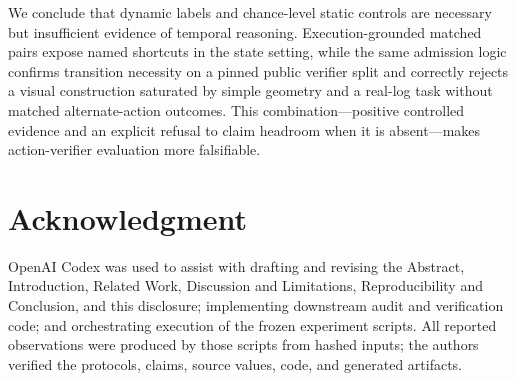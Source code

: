 \documentclass[letterpaper,10pt,conference]{ieeeconf}
\begin{document}
We conclude that dynamic labels and chance-level static controls are necessary
but insufficient evidence of temporal reasoning. Execution-grounded matched
pairs expose named shortcuts in the state setting, while the same admission
logic confirms transition necessity on a pinned public verifier split and
correctly rejects a visual construction saturated by simple geometry and a
real-log task without matched alternate-action outcomes.
This combination---positive controlled evidence and an explicit refusal to
claim headroom when it is absent---makes action-verifier evaluation more
falsifiable.

\section*{Acknowledgment}

OpenAI Codex was used to assist with drafting and revising the Abstract,
Introduction, Related Work, Discussion and Limitations, Reproducibility and
Conclusion, and this disclosure; implementing downstream audit and
verification code; and orchestrating execution of the frozen experiment
scripts. All reported observations were produced by those scripts from hashed
inputs; the authors verified the protocols, claims, source values, code, and
generated artifacts.



\end{document}
